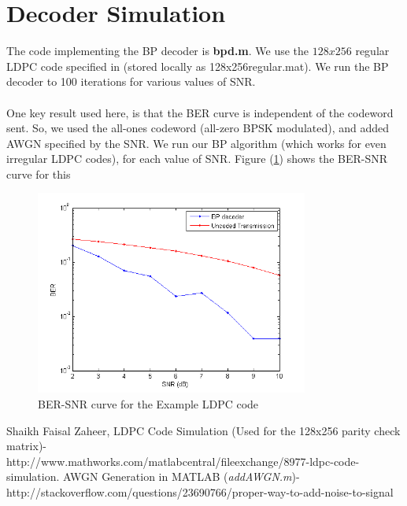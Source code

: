 \documentclass[paper=a4, fontsize=12pt]{scrartcl} %
\numberwithin{equation}{section} %
\numberwithin{figure}{section} %
\numberwithin{table}{section} %
\begin{document}
\section{Decoder Simulation}

The code implementing the BP decoder is \textbf{bpd.m}. We use the $128x256$ regular LDPC code specified in \cite{A} (stored locally as 128x256regular.mat). We run the BP decoder to 100 iterations for various values of SNR.
\\ \\
One key result used here, is that the BER curve is independent of the codeword sent. So, we used the all-ones codeword (all-zero BPSK modulated), and added AWGN specified by the SNR. We run our BP algorithm (which works for even irregular LDPC codes), for each value of SNR. Figure (\ref{bp}) shows the BER-SNR curve for this 

\vspace{-1.0em}
\begin{figure}[h]
\centering
\includegraphics[width=0.8\textwidth]{images/bp}
\caption{BER-SNR curve for the Example LDPC code}
\label{bp}
\end{figure}

\vspace{-2.0em}
\begin{thebibliography}{155}
Shaikh Faisal Zaheer, LDPC Code Simulation (Used for the 128x256 parity check matrix)- 
\\
http://www.mathworks.com/matlabcentral/fileexchange/8977-ldpc-code-simulation. 
AWGN Generation in MATLAB (\textit{addAWGN.m})- \\
http://stackoverflow.com/questions/23690766/proper-way-to-add-noise-to-signal
\end{thebibliography}
\end{document}
